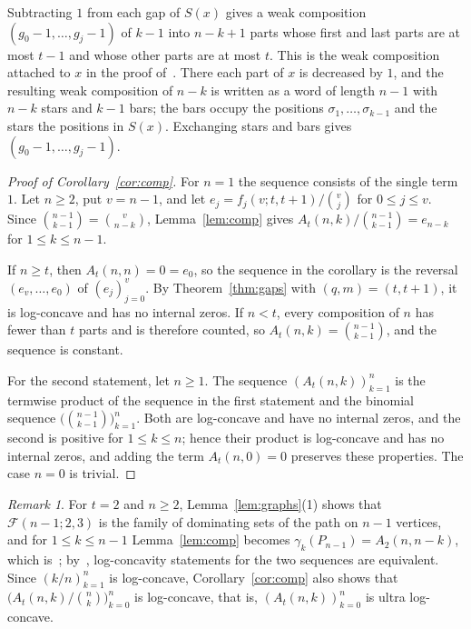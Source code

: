 \documentclass{amsart}
\theoremstyle{definition}
\theoremstyle{remark}
\newtheorem{remark}[theorem]{Remark}
\numberwithin{equation}{section}
\newcommand{\cF}{\mathcal{F}}
\begin{document}
Subtracting $1$ from each gap of $S(x)$ gives a weak composition $(g_0-1,\dots,g_j-1)$ of $k-1$ into $n-k+1$ parts whose first and last parts are at most $t-1$ and whose other parts are at most $t$. This is the weak composition attached to $x$ in the proof of~\cite[Theorem~5.1.8]{Z}. There each part of $x$ is decreased by $1$, and the resulting weak composition of $n-k$ is written as a word of length $n-1$ with $n-k$ stars and $k-1$ bars; the bars occupy the positions $\sigma_1,\dots,\sigma_{k-1}$ and the stars the positions in $S(x)$. Exchanging stars and bars gives $(g_0-1,\dots,g_j-1)$.

\begin{proof}[Proof of Corollary~\ref{cor:comp}]
For $n=1$ the sequence consists of the single term $1$. Let $n\ge2$, put $v=n-1$, and let $e_j=f_j(v;t,t+1)/\binom vj$ for $0\le j\le v$. Since $\binom{n-1}{k-1}=\binom{v}{n-k}$, Lemma~\ref{lem:comp} gives $A_t(n,k)/\binom{n-1}{k-1}=e_{n-k}$ for $1\le k\le n-1$.

If $n\ge t$, then $A_t(n,n)=0=e_0$, so the sequence in the corollary is the reversal $(e_v,\dots,e_0)$ of $(e_j)_{j=0}^{v}$. By Theorem~\ref{thm:gaps} with $(q,m)=(t,t+1)$, it is log-concave and has no internal zeros. If $n<t$, every composition of $n$ has fewer than $t$ parts and is therefore counted, so $A_t(n,k)=\binom{n-1}{k-1}$, and the sequence is constant.

For the second statement, let $n\ge1$. The sequence $(A_t(n,k))_{k=1}^{n}$ is the termwise product of the sequence in the first statement and the binomial sequence $\bigl(\binom{n-1}{k-1}\bigr)_{k=1}^{n}$. Both are log-concave and have no internal zeros, and the second is positive for $1\le k\le n$; hence their product is log-concave and has no internal zeros, and adding the term $A_t(n,0)=0$ preserves these properties. The case $n=0$ is trivial.
\end{proof}

\begin{remark}\label{rem:comp}
For $t=2$ and $n\ge2$, Lemma~\ref{lem:graphs}(1) shows that $\cF(n-1;2,3)$ is the family of dominating sets of the path on $n-1$ vertices, and for $1\le k\le n-1$ Lemma~\ref{lem:comp} becomes $\gamma_k(P_{n-1})=A_2(n,n-k)$, which is~\cite[Theorem~5.1.5]{Z}; by~\cite[Observation~5.1.6]{Z}, log-concavity statements for the two sequences are equivalent. Since $(k/n)_{k=1}^{n}$ is log-concave, Corollary~\ref{cor:comp} also shows that $\bigl(A_t(n,k)/\binom nk\bigr)_{k=0}^{n}$ is log-concave, that is, $(A_t(n,k))_{k=0}^{n}$ is ultra log-concave.
\end{remark}
\end{document}
